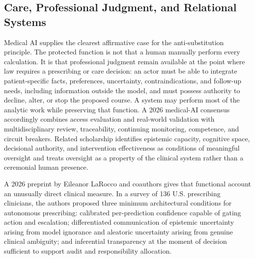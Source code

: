 \subsection{Care, Professional Judgment, and Relational Systems}

Medical AI supplies the clearest affirmative case for the anti-substitution principle. The protected function is not that a human manually perform every calculation. It is that professional judgment remain available at the point where law requires a prescribing or care decision: an actor must be able to integrate patient-specific facts, preferences, uncertainty, contraindications, and follow-up needs, including information outside the model, and must possess authority to decline, alter, or stop the proposed course. A system may perform most of the analytic work while preserving that function. A 2026 medical-AI consensus accordingly combines access evaluation and real-world validation with multidisciplinary review, traceability, continuing monitoring, competence, and circuit breakers. Related scholarship identifies epistemic capacity, cognitive space, decisional authority, and intervention effectiveness as conditions of meaningful oversight and treats oversight as a property of the clinical system rather than a ceremonial human presence.

A 2026 preprint by Eileanor LaRocco and coauthors gives that functional account an unusually direct clinical measure. In a survey of 136 U.S. prescribing clinicians, the authors proposed three minimum architectural conditions for autonomous prescribing: calibrated per-prediction confidence capable of gating action and escalation; differentiated communication of epistemic uncertainty arising from model ignorance and aleatoric uncertainty arising from genuine clinical ambiguity; and inferential transparency at the moment of decision sufficient to support audit and responsibility allocation.

